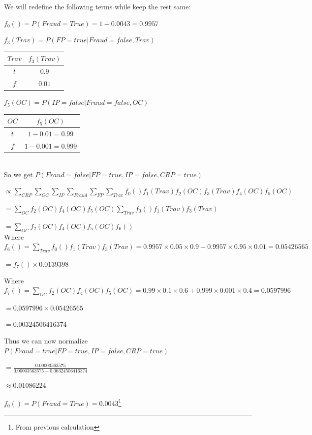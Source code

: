 \documentclass[10pt]{article}
\begin{document}
	We will redefine the following terms while keep the rest same:
	
	$f_0() = P(Fraud = True) = 1 - 0.0043 = 0.9957$
	
	$f_3(Trav) = P(FP = true | Fraud = false, Trav)$
	\begin{tabular}{|c|c|}
	\hline
 	  $Trav$ & $f_3(Trav)$ \\
	\hline
	  $t$ & $ 0.9$  \\
	\hline
	  $f$ & $0.01$ \\
	\hline
	\end{tabular}
	
	$f_5(OC) = P(IP = false | Fraud = false, OC)$
	\begin{tabular}{|c|c|}
	\hline
 	  $OC$ & $f_5(OC)$ \\
	\hline
	  $t$ & $ 1 - 0.01 = 0.99$  \\
	\hline
	  $f$ & $ 1 - 0.001 = 0.999$ \\
	\hline
	\end{tabular}\\
	
	So we get $P(Fraud = false | FP = true, IP = false, CRP = true)$
	
	$\propto \sum_{CRP} \sum_{OC} \sum_{IP} \sum_{Fraud} \sum_{FP} \sum_{Trav} f_0() f_1(Trav) f_2(OC) f_3(Trav) f_4(OC) f_5(OC)$
	
	$= \sum_{OC}f_2(OC) f_4(OC) f_5(OC) \sum_{Trav}f_0() f_1(Trav) f_3(Trav)$
	
	$= \sum_{OC}f_2(OC) f_4(OC) f_5(OC) f_6()$\\
	
	Where $f_6() = \sum_{Trav}f_0() f_1(Trav) f_3(Trav) = 0.9957 \times 0.05 \times 0.9 + 0.9957 \times 0.95 \times 0.01 = 0.05426565$
	
	$= f_7() \times 0.0139398$
	
	Where $f_7() = \sum_{OC}f_2(OC) f_4(OC) f_5(OC) = 0.99 \times 0.1 \times 0.6 + 0.999 \times 0.001 \times 0.4 = 0.0597996$
	
	$ = 0.0597996 \times 0.05426565 $
	
	$ = 0.00324506416374$
	
	Thus we can now normalize $P(Fraud = true | FP = true, IP = false, CRP = true)$
	
	$ = \frac{0.00003563575}{0.00003563575 + 0.00324506416374}$
	
	$\approx 0.01086224$
	
	\fi
	
	\iffalse
	
	$f_0() = P(Fraud = True) = 0.0043$\footnote{From previous calculation}
	
\end{document}
